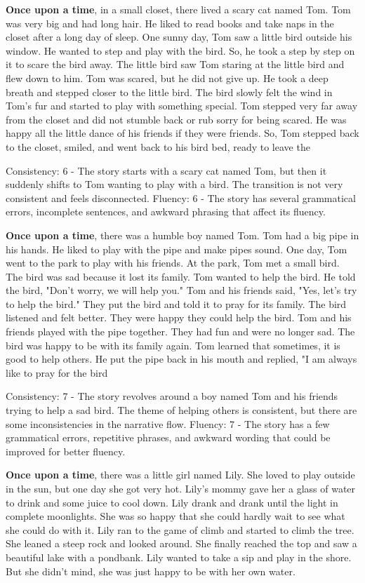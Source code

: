 \documentclass{article}
\begin{document}
\textbf{Once upon a time}, in a small closet, there lived a scary cat named Tom. Tom was very big and had long hair. He liked to read books and take naps in the closet after a long day of sleep. One sunny day, Tom saw a little bird outside his window. He wanted to step and play with the bird. So, he took a step by step on it to scare the bird away. The little bird saw Tom staring at the little bird and flew down to him. Tom was scared, but he did not give up. He took a deep breath and stepped closer to the little bird. The bird slowly felt the wind in Tom's fur and started to play with something special. Tom stepped very far away from the closet and did not stumble back or rub sorry for being scared. He was happy all the little dance of his friends if they were friends. So, Tom stepped back to the closet, smiled, and went back to his bird bed, ready to leave the

Consistency: 6 - The story starts with a scary cat named Tom, but then it suddenly shifts to Tom wanting to play with a bird. The transition is not very consistent and feels disconnected.
Fluency: 6 - The story has several grammatical errors, incomplete sentences, and awkward phrasing that affect its fluency.

\textbf{Once upon a time}, there was a humble boy named Tom. Tom had a big pipe in his hands. He liked to play with the pipe and make pipes sound. One day, Tom went to the park to play with his friends. At the park, Tom met a small bird. The bird was sad because it lost its family. Tom wanted to help the bird. He told the bird, "Don't worry, we will help you." Tom and his friends said, "Yes, let's try to help the bird." They put the bird and told it to pray for its family. The bird listened and felt better. They were happy they could help the bird. Tom and his friends played with the pipe together. They had fun and were no longer sad. The bird was happy to be with its family again. Tom learned that sometimes, it is good to help others. He put the pipe back in his mouth and replied, "I am always like to pray for the bird

Consistency: 7 - The story revolves around a boy named Tom and his friends trying to help a sad bird. The theme of helping others is consistent, but there are some inconsistencies in the narrative flow.
Fluency: 7 - The story has a few grammatical errors, repetitive phrases, and awkward wording that could be improved for better fluency.

\textbf{Once upon a time}, there was a little girl named Lily. She loved to play outside in the sun, but one day she got very hot. Lily's mommy gave her a glass of water to drink and some juice to cool down. Lily drank and drank until the light in complete moonlights. She was so happy that she could hardly wait to see what she could do with it. Lily ran to the game of climb and started to climb the tree. She leaned a steep rock and looked around. She finally reached the top and saw a beautiful lake with a pondbank. Lily wanted to take a sip and play in the shore. But she didn't mind, she was just happy to be with her own water.
\end{document}
